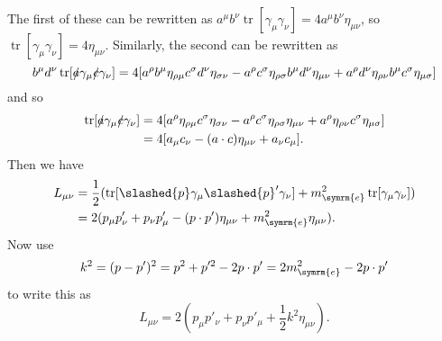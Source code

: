 \documentclass[fleqn]{NotesClass}
\newcommand{\minkowskiMetric}{\eta}
\DeclareMathOperator{\tr}{tr}
\begin{document}
    The first of these can be rewritten as \(a^\mu b^\nu \tr[\gamma_\mu \gamma_\nu] = 4 a^\mu b^\nu \minkowskiMetric_{\mu\nu}\), so \(\tr[\gamma_\mu \gamma_\nu] = 4\minkowskiMetric_{\mu\nu}\).
    Similarly, the second can be rewritten as
    \begin{equation*}
        b^\mu d^\nu \tr[\slashed{a}\gamma_\mu\slashed{c}\gamma_\nu] = 4[a^\rho b^\mu \minkowskiMetric_{\rho \mu} c^\sigma d^\nu \minkowskiMetric_{\sigma\nu} - a^\rho c^\sigma \minkowskiMetric_{\rho\sigma} b^\mu d^\nu \minkowskiMetric_{\mu\nu} + a^\rho d^\nu \minkowskiMetric_{\rho\nu} b^\mu c^\sigma \minkowskiMetric_{\mu\sigma}]
    \end{equation*}
    and so
    \begin{align}
        \tr[\slashed{a}\gamma_\mu\slashed{c}\gamma_\nu] &= 4[a^\rho \minkowskiMetric_{\rho\mu} c^\sigma \minkowskiMetric_{\sigma\nu} - a^\rho c^\sigma \minkowskiMetric_{\rho\sigma}\minkowskiMetric_{\mu\nu} + a^\rho \minkowskiMetric_{\rho\nu} c^\sigma \minkowskiMetric_{\mu\sigma}]\\
        &= 4[a_\mu c_\nu - (a \cdot c)\minkowskiMetric_{\mu\nu} + a_\nu c_\mu].
    \end{align}
    Then we have
    \begin{align}
        L_{\mu\nu} &= \frac{1}{2}(\tr[\slashed{p} \gamma_\mu \slashed{p}' \gamma_\nu] + m_{\symrm{e}}^2 \tr[\gamma_\mu \gamma_\nu])\\
        &= 2(p_\mu p'_\nu + p_\nu p'_\mu - (p \cdot p') \minkowskiMetric_{\mu\nu} + m_{\symrm{e}}^2\minkowskiMetric_{\mu\nu}).
    \end{align}
    Now use
    \begin{equation}
        k^2 = (p - p')^2 = p^2 + p'^2 - 2p \cdot p' = 2m_{\symrm{e}}^2 - 2p \cdot p'
    \end{equation}
    to write this as
    \begin{equation}
        L_{\mu\nu} = 2\left( p_\mu p'_\nu + p_\nu p'_\mu + \frac{1}{2}k^2\minkowskiMetric_{\mu\nu} \right).
    \end{equation}
    
\end{document}
